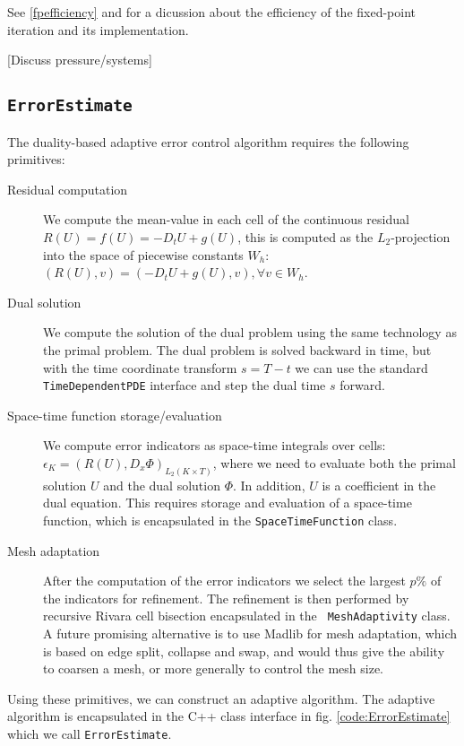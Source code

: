 See \ref{fpefficiency} and \cite{jjan:optrep} for a dicussion about
the efficiency of the fixed-point iteration and its implementation.

[Discuss pressure/systems]

\subsection{\tt ErrorEstimate}

The duality-based adaptive error control algorithm requires the
following primitives:

\begin{description}
\item[Residual computation]
We compute the mean-value in each cell of the continuous residual
$R(U) = f(U) = -D_t U + g(U)$, this is computed as the
$L_2$-projection into the space of piecewise constants $W_h$: $(R(U),
v) = (-D_t U + g(U), v), \forall v \in W_h$.
\item[Dual solution]
We compute the solution of the dual problem using the same technology
as the primal problem. The dual problem is solved backward in time,
but with the time coordinate transform $s = T - t$ we can use the
standard {\tt TimeDependentPDE} interface and step the dual time $s$
forward.
\item[Space-time function storage/evaluation]
We compute error indicators as space-time integrals over cells:
$\epsilon_K = (R(U), D_x \Phi)_{L_2(K \times T)}$, where we need to
evaluate both the primal solution $U$ and the dual solution $\Phi$. In
addition, $U$ is a coefficient in the dual equation. This requires
storage and evaluation of a space-time function, which is encapsulated
in the {\tt SpaceTimeFunction} class.
\item[Mesh adaptation]
After the computation of the error indicators we select the largest
$p\%$ of the indicators for refinement. The refinement is then
performed by recursive Rivara cell bisection encapsulated in the {\tt
MeshAdaptivity} class. A future promising alternative is to use
Madlib \cite{madlib:www, Compere_JCP_2008} for mesh adaptation, which
is based on edge split, collapse and swap, and would thus give the
ability to coarsen a mesh, or more generally to control the mesh size.
\end{description}

Using these primitives, we can construct an adaptive algorithm. The
adaptive algorithm is encapsulated in the C++ class interface in
fig. \ref{code:ErrorEstimate} which we call {\tt ErrorEstimate}.

